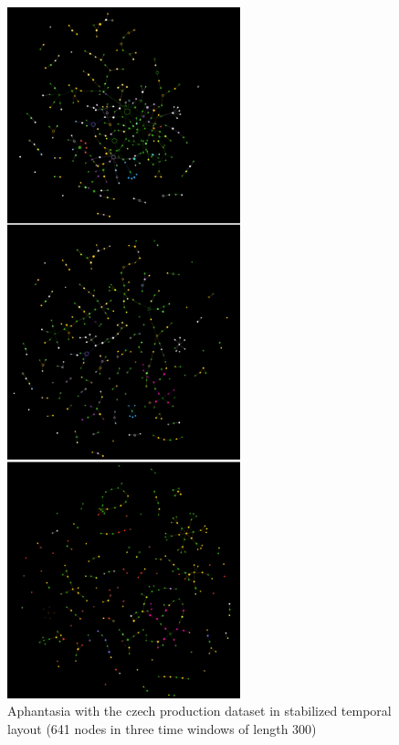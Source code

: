 \begin{figure}[p]
    \includegraphics[height=200mm, keepaspectratio]{img/afantazie_production_dataset_in_time_window.png}
    \caption{Aphantasia with the czech production dataset in stabilized temporal layout (641 nodes in three time windows of length 300)}
    \label{obr:afantazie_production_dataset_in_time_window}
\end{figure}

